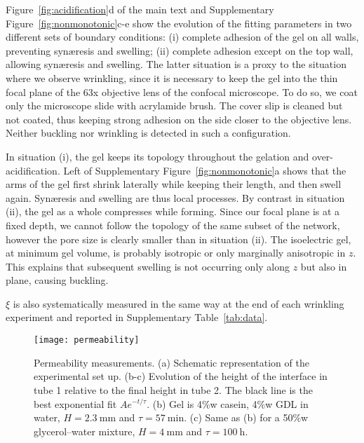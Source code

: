 \documentclass[twocolumn,superscriptaddress,showpacs,preprintnumbers,
amsmath,amssymb,prl]{revtex4-1}
\begin{document}
Figure~\ref{fig:acidification}d of the main text and Supplementary Figure~\ref{fig:nonmonotonic}c-e show the evolution of the fitting parameters in two different sets of boundary conditions: (i) complete adhesion of the gel on all walls, preventing syn\ae{}resis and swelling; (ii) complete adhesion except on the top wall, allowing syn\ae{}resis and swelling. The latter situation is a proxy to the situation where we observe wrinkling, since it is necessary to keep the gel into the thin focal plane of the 63x objective lens of the confocal microscope. To do so, we coat only the microscope slide with acrylamide brush. The cover slip is cleaned but not coated, thus keeping strong adhesion on the side closer to the objective lens. Neither buckling nor wrinkling is detected in such a configuration.

In situation (i), the gel keeps its topology throughout the gelation and over-acidification. Left of Supplementary Figure~\ref{fig:nonmonotonic}a shows that the arms of the gel first shrink laterally while keeping their length, and then swell again. Syn\ae{}resis and swelling are thus local processes. By contrast in situation (ii), the gel as a whole compresses while forming. Since our focal plane is at a fixed depth, we cannot follow the topology of the same subset of the network, however the pore size is clearly smaller than in situation (ii). The isoelectric gel, at minimum gel volume, is probably isotropic or only marginally anisotropic in $z$. This explains that subsequent swelling is not occurring only along $z$ but also in plane, causing buckling.

$\xi$ is also systematically measured in the same way at the end of each wrinkling experiment and reported in Supplementary Table~\ref{tab:data}. %


\begin{figure*}%
	\texttt{[image: permeability]}%
	\caption{Permeability measurements. (a) Schematic representation of the experimental set up. (b-c) Evolution of the height of the interface in tube 1 relative to the final height in tube 2. The black line is the best exponential fit $Ae^{-t/\tau}$. (b) Gel is 4\%w casein, 4\%w GDL in water, $H=\SI{2.3}{\milli\metre}$ and $\tau=\SI{57}{\minute}$. (c) Same as (b) for a 50\%w glycerol--water mixture, $H=\SI{4}{\milli\metre}$ and $\tau=\SI{100}{\hour}$.}%
	\label{fig:permeability}%
\end{figure*}
\end{document}
